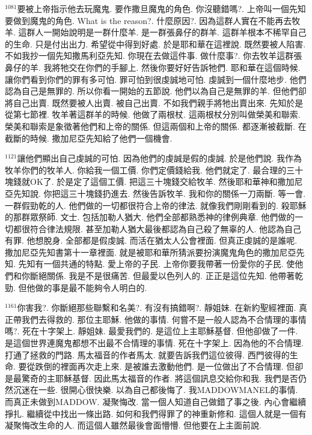 \documentclass{book}
\begin{document}
$^{1081}$要被上帝指示他去玩魔鬼.
要作撒旦魔鬼的角色.
你沒聽錯嗎?.
上帝叫一個先知要做到魔鬼的角色.
What is the reason?.
什麼原因?.
因為這群人實在不能再去牧羊.
這群人一開始說明是一群什麼羊.
是一群張鼻仔的群羊.
這群羊根本不稀罕自己的生命.
只是付出出力.
希望從中得到好處.
於是耶和華在這裡說.
既然要被人陷害.
不如我抄一個先知撒馬利亞先知.
你現在去做這件事.
做什麼事?.
你去牧羊這群張鼻仔的羊.
我將牠交在你們的手腳上.
然後你要好好告訴牠們.
耶和華在這個時候.
讓你們看到你們的罪有多可怕.
罪可怕到很虔誠地可怕.
虔誠到一個什麼地步.
他們認為自己是無罪的.
所以你看一開始的五節說.
他們以為自己是無罪的羊.
但他們卻將自己出賣.
既然要被人出賣.
被自己出賣.
不如我們親手將牠出賣出來.
先知於是從第七節裡.
牧羊著這群羊的時候.
他做了兩根杖.
這兩根杖分別叫做榮美和聯索.
榮美和聯索是象徵著他們和上帝的關係.
但這兩個和上帝的關係.
都逐漸被截斷.
在截斷的時候.
撒加尼亞先知給了他們一個機會.

$^{1121}$讓他們顯出自己虔誠的可怕.
因為他們的虔誠是假的虔誠.
於是他們說.
我作為牧羊你們的牧羊人.
你給我一個工價.
你們定價錢給我.
他們就定了.
最合理的三十塊錢就OK了.
於是定了這個工價.
把這三十塊錢交給牧羊.
然後耶和華神和撒加尼亞先知說.
你把這三十塊錢扔進去.
然後告訴牧羊.
我和你的關係一刀兩斷.
等一會.
一群假勁乾的人.
他們做的一切都很符合上帝的律法.
就像我們剛剛看到的.
殺耶穌的那群眾祭師.
文士.
包括加勒人猶大.
他們全部都熟悉神的律例典章.
他們做的一切都很符合律法規限.
甚至加勒人猶大最後都認為自己殺了無辜的人.
他認為自己有罪.
他想脫身.
全部都是假虔誠.
而活在猶太人公會裡面.
但真正虔誠的是誰呢.
撒加尼亞先知書第十一章裡面.
就是被耶和華所猜派要扮演魔鬼角色的撒加尼亞先知.
先知有一個共通的特點.
愛上帝的子民.
上帝你要我帶著一份愛你的子民.
使他們和你斷絕關係.
我是不是很痛苦.
但最愛以色列人的.
正正是這位先知.
他帶著乾勁.
但他做的事是最不能夠令人明白的.

$^{1161}$你害我?.
你斷絕那些聯繫和名美?.
有沒有搞錯啊?.
靜姐妹.
在新約聖經裡面.
真正帶我們去得救的.
那位主耶穌.
他做的事情.
何嘗不是一般人認為不合情理的事情嗎?.
死在十字架上.
靜姐妹.
最愛我們的.
是這位上主耶穌基督.
但他卻做了一件.
是這個世界連魔鬼都想不出最不合情理的事情.
死在十字架上.
因為他的不合情理.
打通了拯救的門路.
馬太福音的作者馬太.
就要告訴我們這位彼得.
西門彼得的生命.
要從跌倒的裡面再次走上來.
是被誰去激動他們.
是一位做出了不合情理.
但卻是最驚奇的主耶穌基督.
因此馬太福音的作者.
將這個訊息交給你和我.
我們是否仍然沉迷在一些.
很開心很快樂.
以為自己都後悔了.
我MADDOWMANEL的事情.
而真正未做到MADDOW.
凝聚悔改.
當一個人知道自己做錯了事之後.
內心會繼續掙扎.
繼續從中找出一條出路.
如何和我們得罪了的神重新修和.
這個人就是一個有凝聚悔改生命的人.
而這個人雖然最後會面懵懵.
但他要在上主面前說.
\end{document}
